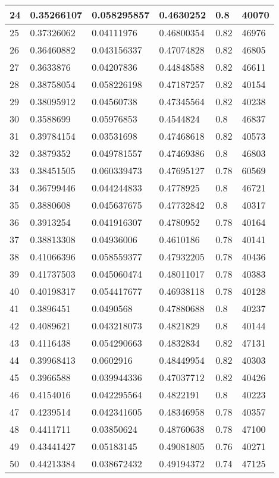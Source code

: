 \begin{longtable}{|l|l|l|l|l|l|}
24 & 0.35266107 & 0.058295857 & 0.4630252 & 0.8 & 40070 \\ \hline 
25 & 0.37326062 & 0.04111976 & 0.46800354 & 0.82 & 46976 \\ \hline 
26 & 0.36460882 & 0.043156337 & 0.47074828 & 0.82 & 46805 \\ \hline 
27 & 0.3633876 & 0.04207836 & 0.44848588 & 0.82 & 46611 \\ \hline 
28 & 0.38758054 & 0.058226198 & 0.47187257 & 0.82 & 40154 \\ \hline 
29 & 0.38095912 & 0.04560738 & 0.47345564 & 0.82 & 40238 \\ \hline 
30 & 0.3588699 & 0.05976853 & 0.4544824 & 0.8 & 46837 \\ \hline 
31 & 0.39784154 & 0.03531698 & 0.47468618 & 0.82 & 40573 \\ \hline 
32 & 0.3879352 & 0.049781557 & 0.47469386 & 0.8 & 46803 \\ \hline 
33 & 0.38451505 & 0.060339473 & 0.47695127 & 0.78 & 60569 \\ \hline 
34 & 0.36799446 & 0.044244833 & 0.4778925 & 0.8 & 46721 \\ \hline 
35 & 0.3880608 & 0.045637675 & 0.47732842 & 0.8 & 40317 \\ \hline 
36 & 0.3913254 & 0.041916307 & 0.4780952 & 0.78 & 40164 \\ \hline 
37 & 0.38813308 & 0.04936006 & 0.4610186 & 0.78 & 40141 \\ \hline 
38 & 0.41066396 & 0.058559377 & 0.47932205 & 0.78 & 40436 \\ \hline 
39 & 0.41737503 & 0.045060474 & 0.48011017 & 0.78 & 40383 \\ \hline 
40 & 0.40198317 & 0.054417677 & 0.46938118 & 0.78 & 40128 \\ \hline 
41 & 0.3896451 & 0.0490568 & 0.47880688 & 0.8 & 40237 \\ \hline 
42 & 0.4089621 & 0.043218073 & 0.4821829 & 0.8 & 40144 \\ \hline 
43 & 0.4116438 & 0.054290663 & 0.4832834 & 0.82 & 47131 \\ \hline 
44 & 0.39968413 & 0.0602916 & 0.48449954 & 0.82 & 40303 \\ \hline 
45 & 0.3966588 & 0.039944336 & 0.47037712 & 0.82 & 40426 \\ \hline 
46 & 0.4154016 & 0.042295564 & 0.4822191 & 0.8 & 40223 \\ \hline 
47 & 0.4239514 & 0.042341605 & 0.48346958 & 0.78 & 40357 \\ \hline 
48 & 0.4411711 & 0.03850624 & 0.48760638 & 0.78 & 47100 \\ \hline 
49 & 0.43441427 & 0.05183145 & 0.49081805 & 0.76 & 40271 \\ \hline 
50 & 0.44213384 & 0.038672432 & 0.49194372 & 0.74 & 47125 \\ \hline 
\end{longtable}